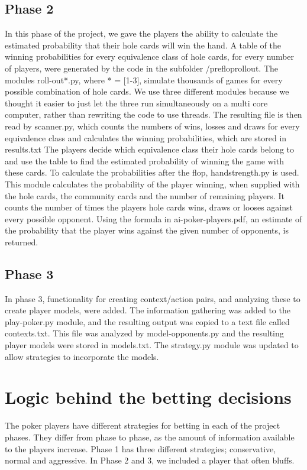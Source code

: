 \documentclass[titlepage]{article}
\begin{document}
	\subsection{Phase 2}
	    In this phase of the project, we gave the players the ability to calculate the estimated probability that their hole cards will win the hand. A table of the winning probabilities for every equivalence class of hole cards, for every number of players, were generated by the code in the subfolder /prefloprollout. The modules roll-out*.py, where * = [1-3], simulate thousands of games for every possible combination of hole cards. We use three different modules because we thought it easier to just let the three run simultaneously on a multi core computer, rather than rewriting the code to use threads. The resulting file is then read by scanner.py, which counts the numbers of wins, losses and draws for every equivalence class and calculates the winning probabilities, which are stored in results.txt The players decide which equivalence class their hole cards belong to and use the table to find the estimated probability of winning the game with these cards. To calculate the probabilities after the flop, handstrength.py is used. This module calculates the probability of the player winning, when supplied with the hole cards, the community cards and the number of remaining players. It counts the number of times the players hole cards wins, draws or looses against every possible opponent. Using the formula in ai-poker-players.pdf, an estimate of the probability that the player wins against the given number of opponents, is returned.
		
    \subsection{Phase 3}
        In phase 3, functionality for creating context/action pairs, and analyzing these to create player models, were added. The information gathering was added to the play-poker.py module, and the resulting output was copied to a text file called contexts.txt. This file was analyzed by model-opponents.py and the resulting player models were stored in models.txt. The strategy.py module was updated to allow strategies to incorporate the models. 

\section{Logic behind the betting decisions}
	The poker players have different strategies for betting in each of the project phases. They differ from phase to phase, as the amount of information available to the players increase. Phase 1 has three different strategies; conservative, normal and aggressive. In Phase 2 and 3, we included a player that often bluffs.
	
\end{document}
